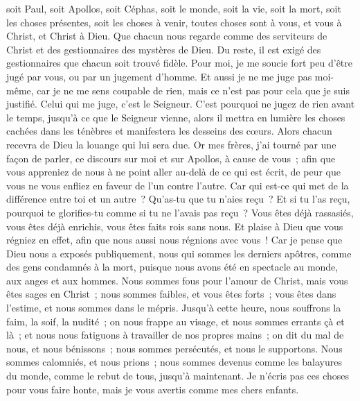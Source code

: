 \begin{multicols}{2}
soit Paul, soit Apollos, soit Céphas, soit le monde, soit la vie, soit la mort, soit les choses présentes, soit les choses à venir, toutes choses sont à vous,
et vous à Christ, et Christ à Dieu.
\VerseOne{}Que chacun nous regarde comme des serviteurs de Christ et des gestionnaires des mystères de Dieu.
Du reste, il est exigé des gestionnaires que chacun soit trouvé fidèle.
Pour moi, je me soucie fort peu d'être jugé par vous, ou par un jugement d'homme. Et aussi je ne me juge pas moi-même, car je ne me sens coupable de rien,
mais ce n'est pas pour cela que je suis justifié. Celui qui me juge, c'est le Seigneur.
C'est pourquoi ne jugez de rien avant le temps, jusqu'à ce que le Seigneur vienne, alors il mettra en lumière les choses cachées dans les ténèbres et manifestera les desseins des cœurs. Alors chacun recevra de Dieu la louange qui lui sera due.
Or mes frères, j'ai tourné par une façon de parler, ce discours sur moi et sur Apollos, à cause de vous~; afin que vous appreniez de nous à ne point aller au-delà de ce qui est écrit, de peur que vous ne vous enfliez en faveur de l'un contre l'autre. 
Car qui est-ce qui met de la différence entre toi et un autre~? Qu'as-tu que tu n'aies reçu~? Et si tu l'as reçu, pourquoi te glorifies-tu comme si tu ne l'avais pas reçu~?
Vous êtes déjà rassasiés, vous êtes déjà enrichis, vous êtes faits rois sans nous. Et plaise à Dieu que vous régniez en effet, afin que nous aussi nous régnions avec vous~!
Car je pense que Dieu nous a exposés publiquement, nous qui sommes les derniers apôtres, comme des gens condamnés à la mort, puisque nous avons été en spectacle au monde, aux anges et aux hommes.
Nous sommes fous pour l'amour de Christ, mais vous êtes sages en Christ~; nous sommes faibles, et vous êtes forts~; vous êtes dans l'estime, et nous sommes dans le mépris.
Jusqu'à cette heure, nous souffrons la faim, la soif, la nudité~; on nous frappe au visage, et nous sommes errants çà et là~;
et nous nous fatiguons à travailler de nos propres mains~; on dit du mal de nous, et nous bénissons~; nous sommes persécutés, et nous le supportons.
Nous sommes calomniés, et nous prions~; nous sommes devenus comme les balayures du monde, comme le rebut de tous, jusqu'à maintenant.
Je n'écris pas ces choses pour vous faire honte, mais je vous avertis comme mes chers enfants.

\end{multicols}
